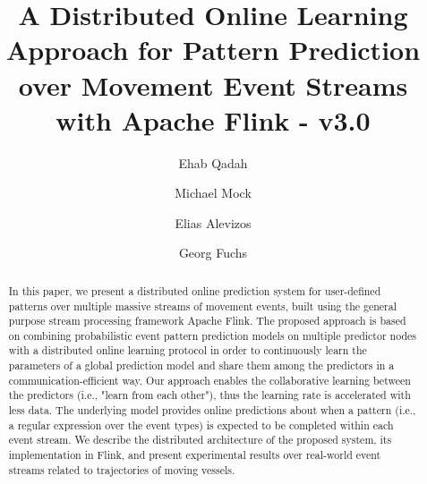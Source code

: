 \documentclass[sigconf,edbt]{acmart-edbt2018}
\begin{document}
\title{A Distributed Online Learning Approach for Pattern Prediction over Movement Event Streams with Apache Flink - v3.0}

%
  
\author{Ehab Qadah}

\author{Michael Mock}


\author{Elias Alevizos}

\author{Georg Fuchs}

\renewcommand{\shortauthors}{}


\begin{abstract}
In this paper, we present a distributed online prediction system for user-defined patterns over multiple massive streams of movement events, built using the general purpose stream processing framework Apache Flink. The proposed approach is based on combining probabilistic event pattern prediction models on multiple predictor nodes with a distributed online learning protocol in order to continuously learn the parameters of a global prediction model and share them among the predictors in a communication-efficient way. Our approach enables the  collaborative learning between the predictors (i.e., "learn from each other"), thus the learning rate is accelerated with less data. The underlying model provides online predictions about when a pattern (i.e., a regular expression over the event types) is expected to be completed within each event stream. We describe the distributed architecture of the proposed system, its implementation in Flink, and present experimental results over real-world event streams related to trajectories of moving vessels.

\end{abstract}
\end{document}
